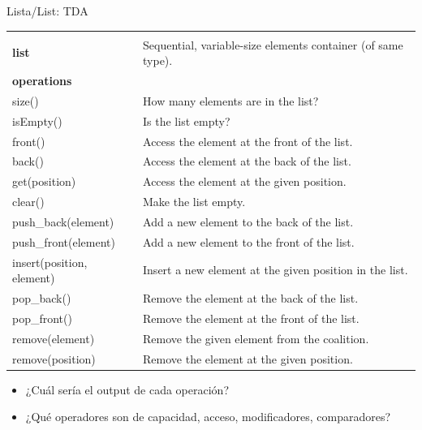 \documentclass{beamer} %
\begin{document}
\begin{frame}{Lista/List: TDA}
    \scriptsize{
    \begin{tabular}{lp{60ex}}\hline\\[-1ex]
      {\bf\normalsize list} & Sequential, variable-size elements container (of same type).\\[1.5ex]
      {\bf\small operations}  & \\
      size()            & How many elements are in the list?\\
      isEmpty()         & Is the list empty?\\
      front()           & Access the element at the front of the list.\\
      back()            & Access the element at the back of the list.\\
      get(position)     & Access the element at the given position.\\
      clear()           & Make the list empty.\\
      push\_back(element)  & Add a new element to the back of the list.\\
      push\_front(element) & Add a new element to the front of the list.\\
      insert(position, element) & Insert a new element at the given position in the list.\\
      pop\_back()       & Remove the element at the back of the list.\\
      pop\_front()      & Remove the element at the front of the list.\\
      remove(element)   & Remove the given element from the coalition. \\
      remove(position)  & Remove the element at the given position. \\[1.5ex]\hline
    \end{tabular}

    \begin{itemize}
        \item<2-> ¿Cuál sería el output de cada operación?
        \item<2-> ¿Qué operadores son de capacidad, acceso, modificadores, comparadores?
    \end{itemize}}
\end{frame}
\end{document}
